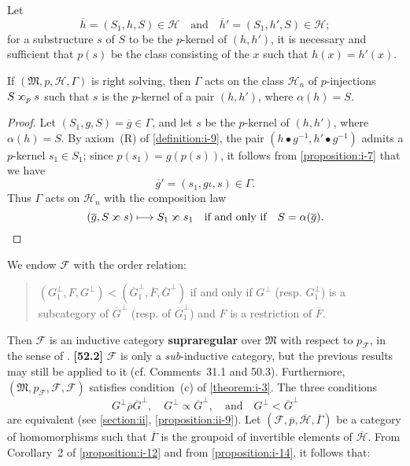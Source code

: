 \documentclass[a4paper,fleqn]{article}
\theoremstyle{plain}
\newenvironment{proposition}[1]
  {\renewcommand\theinnerproposition{#1}\innerproposition}
  {\endinnerproposition}
\theoremstyle{definition}
\newenvironment{longcomm}[1]
  {\noindent\textbf{[#1]}\rmfamily}
  {}
\newcommand{\unsure}[1]{{\color{purple}\textbf{#1}}}
\newcommand{\textand}{\quad\text{and}\quad}
\newcommand{\HH}{\mathcal{H}}
\newcommand{\bHH}{\overline{\HH}}
\newcommand{\MM}{\mathfrak{M}}
\newcommand{\FF}{\mathcal{F}}
\newcommand{\relrhobar}{\mathrel{\overline{\rho}}}
\newcommand{\subs}{\mathrel{\propto}}
\newcommand{\sups}{\mathrel{\reflectbox{$\propto$}}}
\begin{document}
Let
\[
  \overline{h} = (S_1,h,S)\in\HH
  \textand
  \overline{h}' = (S_1,h',S)\in\HH;
\]
for a substructure $s$ of $S$ to be the $p$-kernel of $(h,h')$, it is necessary and sufficient that $p(s)$ be the class consisting of the $x$ such that $h(x)=h'(x)$.

\begin{proposition}{16}
\label{proposition:i-16}
  If $(\MM,p,\HH,\Gamma)$ is right solving, then $\Gamma$ acts on the class $\HH_n$ of $p$-injections $S\sups_p s$ such that $s$ is the $p$-kernel of a pair $(h,h')$, where $\alpha(h)=S$.
\end{proposition}

\begin{proof}
  Let $(S_1,g,S)=\overline{g}\in\Gamma$, and let $s$ be the $p$-kernel of $(h,h')$, where $\alpha(h)=S$.
  By axiom~(R) of \cref{definition:i-9}, the pair $(h\bullet g^{-1},h'\bullet g^{-1})$ admits a $p$-kernel $s_1\in S_1$;
  since $p(s_1)=g(p(s))$, it follows from \cref{proposition:i-7} that we have
  \[
    \overline{g}' = (s_1,g\iota,s)
    \in\Gamma.
  \]
  Thus $\Gamma$ acts on $\HH_n$ with the composition law
  \[
    (\overline{g},S\sups s)
    \longmapsto S_1\sups s_1
    \quad\text{if and only if}\quad
    S=\alpha(\overline{g}).
    \qedhere
  \]
\end{proof}

We endow $\FF$ with the order relation:
\begin{quote}
  $(G_1^\perp,F,G^\perp)<(\overline{G}_1^\perp,\overline{F},\overline{G}^\perp)$
  \qquad if and only if\quad
  $G^\perp$ (resp. $G_1^\perp$) is a subcategory of $\overline{G}^\perp$ (resp. of $\overline{G}_1^\perp$) and $F$ is a restriction of $\overline{F}$.
\end{quote}

Then $\FF$ is an inductive category \unsure{supraregular} over $\MM$ with respect to $p_\FF$, in the sense of \cite{3c}.
\begin{longcomm}{52.2}
  $\FF$ is only a \emph{sub}-inductive category, but the previous results may still be applied to it (cf. Comments~31.1 and 50.3).
\end{longcomm}
Furthermore, $(\MM,p_\FF,\FF,\FF)$ satisfies condition~(c) of \cref{theorem:i-3}.
The three conditions
\[
  G^\perp\relrhobar\overline{G}^\perp,
  \quad G^\perp\subs\overline{G}^\perp,
  \textand G^\perp<\overline{G}^\perp
\]
are equivalent (see \cref{section:ii}, \cref{proposition:ii-9}).
Let $(\FF,\overline{p},\bHH,\overline{\Gamma})$ be a category of homomorphisms such that $\overline{\Gamma}$ is the groupoid of invertible elements of $\bHH$.
From Corollary~2 of \cref{proposition:i-12} and from \cref{proposition:i-14}, it follows that:
\end{document}
